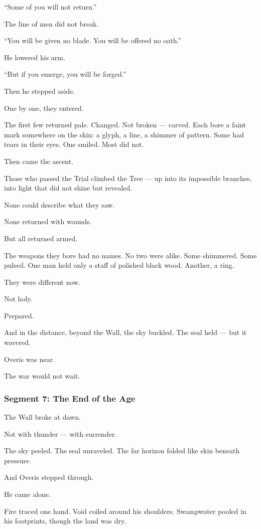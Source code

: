 \documentclass[9pt]{article}
\begin{document}
``Some of you will not return.''

The line of men did not break.

``You will be given no blade. You will be offered no oath.''

He lowered his arm.

``But if you emerge, you will be forged.''

Then he stepped aside.

One by one, they entered.

The first few returned pale. Changed. Not broken — carved. Each bore a faint mark somewhere on the skin: a glyph, a line, a shimmer of pattern. Some had tears in their eyes. One smiled. Most did not.

Then came the ascent.

Those who passed the Trial climbed the Tree — up into its impossible branches, into light that did not shine but revealed.

None could describe what they saw.

None returned with wounds.

But all returned armed.

The weapons they bore had no names. No two were alike. Some shimmered. Some pulsed. One man held only a staff of polished black wood. Another, a ring.

They were different now.

Not holy.

Prepared.

And in the distance, beyond the Wall, the sky buckled. The seal held — but it wavered.

Overis was near.

The war would not wait.


\newpage

\subsubsection*{Segment 7: The End of the Age}

The Wall broke at dawn.

Not with thunder — with surrender.

The sky peeled. The seal unraveled. The far horizon folded like skin beneath pressure.

And Overis stepped through.

He came alone.

Fire traced one hand. Void coiled around his shoulders. Swampwater pooled in his footprints, though the land was dry.
\end{document}
